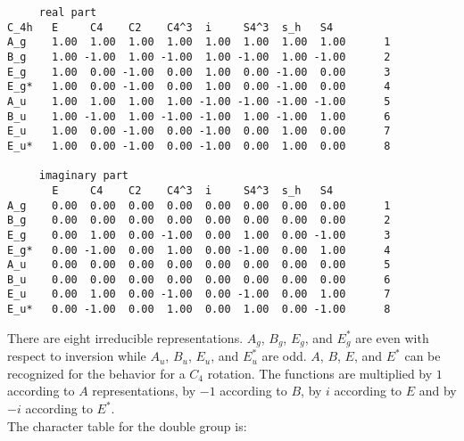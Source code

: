 \documentclass[12pt,a4paper,twoside]{report}
\begin{document}
\begin{tcolorbox}
\begin{footnotesize}
\begin{verbatim}
     real part
C_4h   E     C4    C2    C4^3  i     S4^3  s_h   S4   
A_g    1.00  1.00  1.00  1.00  1.00  1.00  1.00  1.00      1
B_g    1.00 -1.00  1.00 -1.00  1.00 -1.00  1.00 -1.00      2
E_g    1.00  0.00 -1.00  0.00  1.00  0.00 -1.00  0.00      3
E_g*   1.00  0.00 -1.00  0.00  1.00  0.00 -1.00  0.00      4
A_u    1.00  1.00  1.00  1.00 -1.00 -1.00 -1.00 -1.00      5
B_u    1.00 -1.00  1.00 -1.00 -1.00  1.00 -1.00  1.00      6
E_u    1.00  0.00 -1.00  0.00 -1.00  0.00  1.00  0.00      7
E_u*   1.00  0.00 -1.00  0.00 -1.00  0.00  1.00  0.00      8

     imaginary part
       E     C4    C2    C4^3  i     S4^3  s_h   S4   
A_g    0.00  0.00  0.00  0.00  0.00  0.00  0.00  0.00      1
B_g    0.00  0.00  0.00  0.00  0.00  0.00  0.00  0.00      2
E_g    0.00  1.00  0.00 -1.00  0.00  1.00  0.00 -1.00      3
E_g*   0.00 -1.00  0.00  1.00  0.00 -1.00  0.00  1.00      4
A_u    0.00  0.00  0.00  0.00  0.00  0.00  0.00  0.00      5
B_u    0.00  0.00  0.00  0.00  0.00  0.00  0.00  0.00      6
E_u    0.00  1.00  0.00 -1.00  0.00 -1.00  0.00  1.00      7
E_u*   0.00 -1.00  0.00  1.00  0.00  1.00  0.00 -1.00      8
\end{verbatim}
\end{footnotesize}
\end{tcolorbox}

There are eight irreducible representations. $A_g$, $B_g$, $E_g$, and
$E_g^*$ are even with respect to inversion while $A_u$, $B_u$, $E_u$,
and $E_u^*$ are odd. $A$, $B$, $E$, and $E^*$ can be recognized for the
behavior for a $C_4$ rotation. The functions are multiplied by 
$1$ according to $A$ representations, by $-1$ according to $B$,
by $i$ according to $E$ and by $-i$ according to $E^*$. \\
The character table for the double group is:
\end{document}
